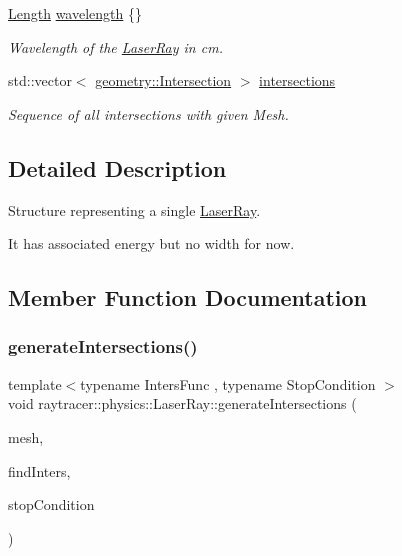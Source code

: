 \begin{DoxyCompactItemize}
\hyperlink{structraytracer_1_1physics_1_1Length}{Length} \hyperlink{structraytracer_1_1physics_1_1LaserRay_af0d865a3db62a989276cad5dbd2d28cd}{wavelength} \{\}
\begin{DoxyCompactList}\small\item\em Wavelength of the \hyperlink{structraytracer_1_1physics_1_1LaserRay}{Laser\+Ray} in cm. \end{DoxyCompactList}\item 
std\+::vector$<$ \hyperlink{structraytracer_1_1geometry_1_1Intersection}{geometry\+::\+Intersection} $>$ \hyperlink{structraytracer_1_1physics_1_1LaserRay_a8d41ff2d7ea5212bd39d1c4ae8ffde7d}{intersections}
\begin{DoxyCompactList}\small\item\em Sequence of all intersections with given Mesh. \end{DoxyCompactList}\end{DoxyCompactItemize}


\subsection{Detailed Description}
Structure representing a single \hyperlink{structraytracer_1_1physics_1_1LaserRay}{Laser\+Ray}. 

It has associated energy but no width for now. 

\subsection{Member Function Documentation}
\mbox{\label{structraytracer_1_1physics_1_1LaserRay_ab54b08958f38711dfd46d49bb2ef583d}} 
\subsubsection{\texorpdfstring{generate\+Intersections()}{generateIntersections()}}
{\footnotesize\ttfamily template$<$typename Inters\+Func , typename Stop\+Condition $>$ \\
void raytracer\+::physics\+::\+Laser\+Ray\+::generate\+Intersections (\begin{DoxyParamCaption}\item[{const \hyperlink{classraytracer_1_1geometry_1_1Mesh}{geometry\+::\+Mesh} \&}]{mesh,  }\item[{Inters\+Func}]{find\+Inters,  }\item[{Stop\+Condition}]{stop\+Condition }\end{DoxyParamCaption})\hspace{0.3cm}{\ttfamily [inline]}}



